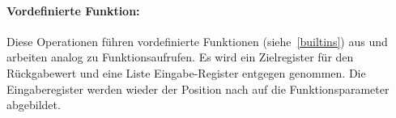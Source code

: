\documentclass[twoside,a4paper,fleqn,12pt]{book}
\begin{document}


\paragraph{Vordefinierte Funktion:} Diese Operationen führen vordefinierte Funktionen (siehe~\ref{builtins}) aus
und arbeiten analog zu Funktionsaufrufen. Es wird ein Zielregister für den Rückgabewert%
und eine Liste Eingabe-Register entgegen genommen. Die Eingaberegister werden wieder der Position nach auf die Funktionsparameter abgebildet.





\end{document}
